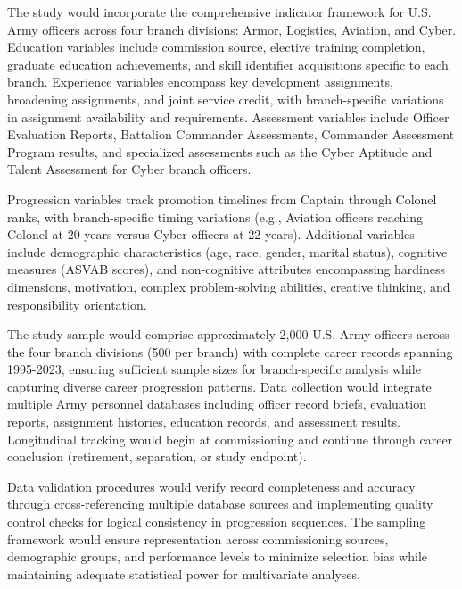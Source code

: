 \documentclass[main.tex]{subfiles}
\begin{document}

The study would incorporate the comprehensive indicator framework for U.S. Army officers across four branch divisions: Armor, Logistics, Aviation, and Cyber. Education variables include commission source, elective training completion, graduate education achievements, and skill identifier acquisitions specific to each branch. Experience variables encompass key development assignments, broadening assignments, and joint service credit, with branch-specific variations in assignment availability and requirements. Assessment variables include Officer Evaluation Reports, Battalion Commander Assessments, Commander Assessment Program results, and specialized assessments such as the Cyber Aptitude and Talent Assessment for Cyber branch officers.

Progression variables track promotion timelines from Captain through Colonel ranks, with branch-specific timing variations (e.g., Aviation officers reaching Colonel at 20 years versus Cyber officers at 22 years). Additional variables include demographic characteristics (age, race, gender, marital status), cognitive measures (ASVAB scores), and non-cognitive attributes encompassing hardiness dimensions, motivation, complex problem-solving abilities, creative thinking, and responsibility orientation\cite{potential2024}.


The study sample would comprise approximately 2,000 U.S. Army officers across the four branch divisions (500 per branch) with complete career records spanning 1995-2023, ensuring sufficient sample sizes for branch-specific analysis while capturing diverse career progression patterns. Data collection would integrate multiple Army personnel databases including officer record briefs, evaluation reports, assignment histories, education records, and assessment results. Longitudinal tracking would begin at commissioning and continue through career conclusion (retirement, separation, or study endpoint).

Data validation procedures would verify record completeness and accuracy through cross-referencing multiple database sources and implementing quality control checks for logical consistency in progression sequences. The sampling framework would ensure representation across commissioning sources, demographic groups, and performance levels to minimize selection bias while maintaining adequate statistical power for multivariate analyses.
\end{document}
